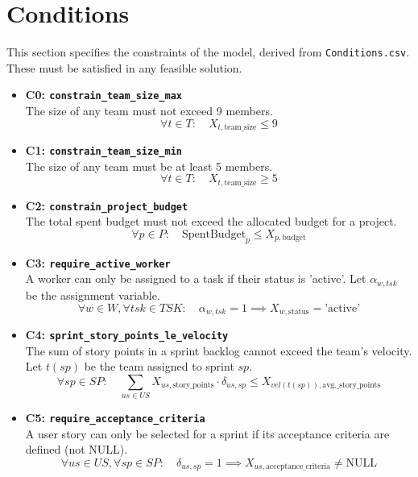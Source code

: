 \documentclass[11pt, a4paper]{article}
\begin{document}
\section{Conditions}
This section specifies the constraints of the model, derived from \texttt{Conditions.csv}. These must be satisfied in any feasible solution.

\begin{itemize}
    \item \textbf{C0: \texttt{constrain\_team\_size\_max}}
    \\ The size of any team must not exceed 9 members.
    $$ \forall t \in T: \quad X_{t, \text{team\_size}} \le 9 $$
    
    \item \textbf{C1: \texttt{constrain\_team\_size\_min}}
    \\ The size of any team must be at least 5 members.
    $$ \forall t \in T: \quad X_{t, \text{team\_size}} \ge 5 $$

    \item \textbf{C2: \texttt{constrain\_project\_budget}}
    \\ The total spent budget must not exceed the allocated budget for a project.
    $$ \forall p \in P: \quad \text{SpentBudget}_p \le X_{p, \text{budget}} $$
    
    \item \textbf{C3: \texttt{require\_active\_worker}}
    \\ A worker can only be assigned to a task if their status is 'active'. Let $\alpha_{w,tsk}$ be the assignment variable.
    $$ \forall w \in W, \forall tsk \in TSK: \quad \alpha_{w,tsk} = 1 \implies X_{w, \text{status}} = \text{'active'} $$

    \item \textbf{C4: \texttt{sprint\_story\_points\_le\_velocity}}
    \\ The sum of story points in a sprint backlog cannot exceed the team's velocity. Let $t(sp)$ be the team assigned to sprint $sp$.
    $$ \forall sp \in SP: \quad \sum_{us \in US} X_{us, \text{story\_points}} \cdot \delta_{us,sp} \le X_{vel(t(sp)), \text{avg.\_story\_points}} $$

    \item \textbf{C5: \texttt{require\_acceptance\_criteria}}
    \\ A user story can only be selected for a sprint if its acceptance criteria are defined (not NULL).
    $$ \forall us \in US, \forall sp \in SP: \quad \delta_{us,sp} = 1 \implies X_{us, \text{acceptance\_criteria}} \neq \text{NULL} $$
    

\end{itemize}
\end{document}
